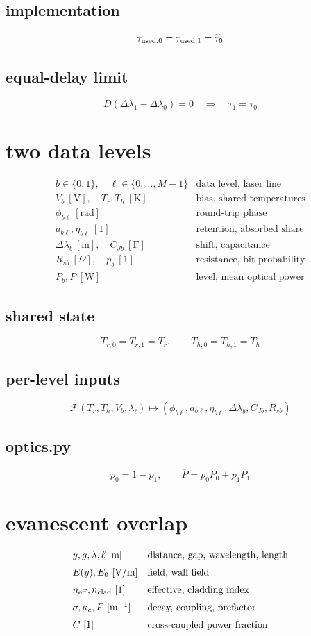 \documentclass[11pt]{article}
\begin{document}
\subsection*{implementation}
\[
\displaystyle \tau_{{\rm used},0}=\tau_{{\rm used},1}=\widetilde\tau_0
\]
\subsection*{equal-delay limit}
\[
\displaystyle D(\Delta\lambda_1-\Delta\lambda_0)=0\quad\Longrightarrow\quad\widetilde\tau_1=\widetilde\tau_0
\]

\clearpage
\section*{two data levels}
\[
\begin{array}{ll}b\in\{0,1\},\quad\ell\in\{0,\ldots,M-1\}&\text{data level, laser line}\\[0.6em]V_b\ [\mathrm V],\quad T_r,T_h\ [\mathrm K]&\text{bias, shared temperatures}\\[0.6em]\phi_{b\ell}\ [\mathrm{rad}]&\text{round-trip phase}\\[0.6em]a_{b\ell},\eta_{b\ell}\ [1]&\text{retention, absorbed share}\\[0.6em]\Delta\lambda_b\ [\mathrm m],\quad C_{Jb}\ [\mathrm F]&\text{shift, capacitance}\\[0.6em]R_{sb}\ [\Omega],\quad p_b\ [1]&\text{resistance, bit probability}\\[0.6em]P_b,\overline P\ [\mathrm W]&\text{level, mean optical power}\end{array}
\]
\subsection*{shared state}
\[
\displaystyle T_{r,0}=T_{r,1}=T_r,\qquad T_{h,0}=T_{h,1}=T_h
\]
\subsection*{per-level inputs}
\[
\displaystyle \mathcal F(T_r,T_h,V_b,\lambda_\ell)\mapsto\left(\phi_{b\ell},a_{b\ell},\eta_{b\ell},\Delta\lambda_b,C_{Jb},R_{sb}\right)
\]
\subsection*{optics.py}
\[
\displaystyle p_0=1-p_1,\qquad\overline P=p_0P_0+p_1P_1
\]

\clearpage
\section*{evanescent overlap}
\[
\begin{array}{ll}y,g,\lambda,\ell\ [\mathrm m]&\text{distance, gap, wavelength, length}\\[0.6em]E(y),E_0\ [\mathrm{V/m}]&\text{field, wall field}\\[0.6em]n_{\rm eff},n_{\rm clad}\ [1]&\text{effective, cladding index}\\[0.6em]\sigma,\kappa_c,F\ [\mathrm{m^{-1}}]&\text{decay, coupling, prefactor}\\[0.6em]C\ [1]&\text{cross-coupled power fraction}\end{array}
\]
\end{document}
